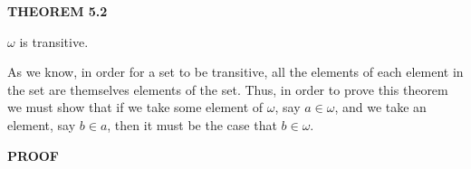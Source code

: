 \documentclass[12pt, a4paper]{article}
\begin{document}
\restoregeometry

\newpage

\noindent\blacksquare\textbf{ THEOREM 5.2}\par

\vspace{4mm}

$\omega$ is transitive.\par

\vspace{4mm}

\noindent As we know, in order for a set to be transitive, all the elements of each element in the set are themselves elements of the set. Thus, in order to prove this theorem we must show that if we take some element of $\omega$, say $a\in\omega$, and we take an element, say $b\in a$, then it must be the case that $b\in\omega$.\par

\vspace{4mm}

\newpage


\noindent\textbf{PROOF}\par

\vspace{4mm}
\end{document}
